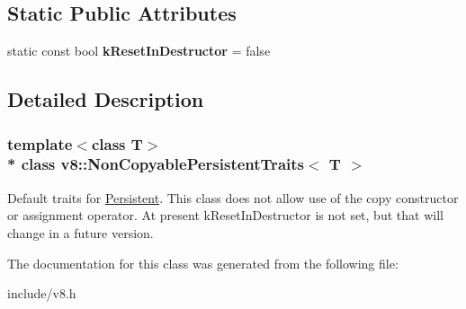 \subsection*{Static Public Attributes}
\begin{DoxyCompactItemize}
\item 
static const bool {\bfseries k\+Reset\+In\+Destructor} = false\hypertarget{classv8_1_1_non_copyable_persistent_traits_a650880d85ff80634c30a195d20329681}{}\label{classv8_1_1_non_copyable_persistent_traits_a650880d85ff80634c30a195d20329681}

\end{DoxyCompactItemize}


\subsection{Detailed Description}
\subsubsection*{template$<$class T$>$\\*
class v8\+::\+Non\+Copyable\+Persistent\+Traits$<$ T $>$}

Default traits for \hyperlink{classv8_1_1_persistent}{Persistent}. This class does not allow use of the copy constructor or assignment operator. At present k\+Reset\+In\+Destructor is not set, but that will change in a future version. 

The documentation for this class was generated from the following file\+:\begin{DoxyCompactItemize}
\item 
include/v8.\+h\end{DoxyCompactItemize}
